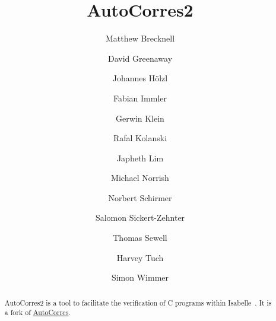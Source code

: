 \documentclass[11pt,a4paper]{report}
\begin{document}
\title{AutoCorres2}
\author{
 Matthew Brecknell \and
 David Greenaway \and
 Johannes Hölzl \and
 Fabian Immler \and 
 Gerwin Klein \and
 Rafal Kolanski \and
 Japheth Lim \and
 Michael Norrish \and
 Norbert Schirmer \and
 Salomon Sickert-Zehnter \and
 Thomas Sewell \and
 Harvey Tuch \and
 Simon Wimmer
}
\maketitle

\begin{abstract}
  AutoCorres2 is a tool to facilitate the verification of C programs within Isabelle~\cite{LNCS2283}.
  It is a fork of \href{https://trustworthy.systems/projects/OLD/autocorres/}{AutoCorres}.
\end{abstract}

\setlength\cftsubsecnumwidth{4em}
\tableofcontents






\end{document}
